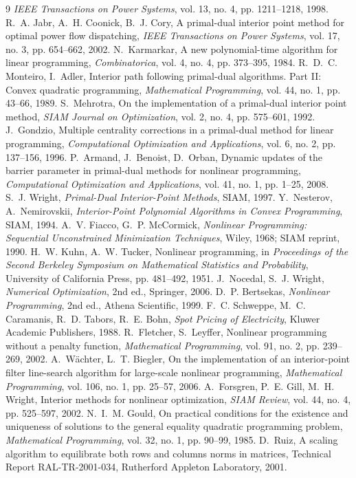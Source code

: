 {\begin{thebibliography}{9}
\emph{IEEE Transactions on Power Systems}, vol. 13, no. 4, pp. 1211--1218,
1998.
 R.~A. Jabr, A.~H. Coonick, B.~J. Cory, A primal-dual
interior point method for optimal power flow dispatching, \emph{IEEE
Transactions on Power Systems}, vol. 17, no. 3, pp. 654--662, 2002.
 N.~Karmarkar, A new polynomial-time algorithm for
linear programming, \emph{Combinatorica}, vol. 4, no. 4, pp. 373--395, 1984.
 R.~D.~C. Monteiro, I.~Adler, Interior path
following primal-dual algorithms. Part II: Convex quadratic programming,
\emph{Mathematical Programming}, vol. 44, no. 1, pp. 43--66, 1989.
 S.~Mehrotra, On the implementation of a primal-dual
interior point method, \emph{SIAM Journal on Optimization}, vol. 2, no. 4,
pp. 575--601, 1992.
 J.~Gondzio, Multiple centrality corrections in a
primal-dual method for linear programming, \emph{Computational Optimization
and Applications}, vol. 6, no. 2, pp. 137--156, 1996.
 P.~Armand, J.~Benoist, D.~Orban, Dynamic
updates of the barrier parameter in primal-dual methods for nonlinear
programming, \emph{Computational Optimization and Applications}, vol. 41,
no. 1, pp. 1--25, 2008.
 S.~J. Wright, \emph{Primal-Dual Interior-Point
Methods}, SIAM, 1997.
 Y.~Nesterov, A.~Nemirovskii,
\emph{Interior-Point Polynomial Algorithms in Convex Programming}, SIAM, 1994.
 A.~V. Fiacco, G.~P. McCormick,
\emph{Nonlinear Programming: Sequential Unconstrained Minimization
Techniques}, Wiley, 1968; SIAM reprint, 1990.
 H.~W. Kuhn, A.~W. Tucker, Nonlinear programming,
in \emph{Proceedings of the Second Berkeley Symposium on Mathematical
Statistics and Probability}, University of California Press, pp. 481--492,
1951.
 J.~Nocedal, S.~J. Wright, \emph{Numerical
Optimization}, 2nd ed., Springer, 2006.
 D.~P. Bertsekas, \emph{Nonlinear Programming},
2nd ed., Athena Scientific, 1999.
 F.~C. Schweppe, M.~C. Caramanis, R.~D. Tabors,
R.~E. Bohn, \emph{Spot Pricing of Electricity}, Kluwer Academic Publishers,
1988.
 R.~Fletcher, S.~Leyffer, Nonlinear programming
without a penalty function, \emph{Mathematical Programming}, vol. 91, no. 2,
pp. 239--269, 2002.
 A.~W\"achter, L.~T. Biegler, On the
implementation of an interior-point filter line-search algorithm for
large-scale nonlinear programming, \emph{Mathematical Programming}, vol. 106,
no. 1, pp. 25--57, 2006.
 A.~Forsgren, P.~E. Gill, M.~H. Wright,
Interior methods for nonlinear optimization, \emph{SIAM Review}, vol. 44,
no. 4, pp. 525--597, 2002.
 N.~I.~M. Gould, On practical conditions for the
existence and uniqueness of solutions to the general equality quadratic
programming problem, \emph{Mathematical Programming}, vol. 32, no. 1,
pp. 90--99, 1985.
 D.~Ruiz, A scaling algorithm to equilibrate both rows and
columns norms in matrices, Technical Report RAL-TR-2001-034, Rutherford
Appleton Laboratory, 2001.
\end{thebibliography}}

